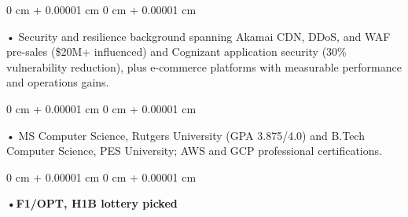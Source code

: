 \documentclass[10pt, letterpaper]{article}
\newenvironment{onecolentry}{
    \begin{adjustwidth}{
        0 cm + 0.00001 cm
    }{
        0 cm + 0.00001 cm
    }
}{
    \end{adjustwidth}
} %
\begin{document}
        \begin{onecolentry}
            • Security and resilience background spanning Akamai CDN, DDoS, and WAF pre-sales (\$20M+ influenced) and Cognizant application security (30\% vulnerability reduction), plus e-commerce platforms with measurable performance and operations gains.
        \end{onecolentry}
        \begin{onecolentry}
            • MS Computer Science, Rutgers University (GPA 3.875/4.0) and B.Tech Computer Science, PES University; AWS and GCP professional certifications.
        \end{onecolentry}
        \begin{onecolentry}
                \textbf{•F1/OPT, H1B lottery picked}
        \end{onecolentry}

    \vspace{2 pt }
\end{document}
